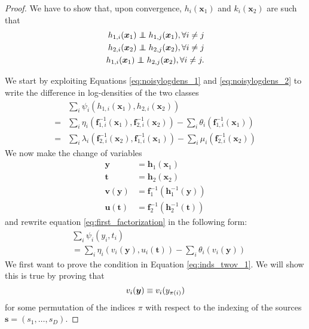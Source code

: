 \begin{proof}
We have to
show that, upon convergence, $h_{i}(\bm{x}_{1})$ and $k_{i}(\bm{x}_{2})$
are such that
\begin{align}
h_{1,i}(\bm{x}_{1})\independent h_{1,j}(\bm{x}_{1}),\forall i\neq j \label{eq:inds_twov_1} \\
h_{2,i}(\bm{x}_{2})\independent h_{2,j}(\bm{x}_{2}),\forall i\neq j \label{eq:inds_twov_2}\\
h_{1,i}(\bm{x}_{1})\independent h_{2,j}(\bm{x}_{2}),\forall i\neq j. \label{eq:inds_twov_3}
    \end{align}

We start by exploiting Equations \ref{eq:noisylogdens_1} and \ref{eq:noisylogdens_2} to write the difference in log-densities of the two classes
\begin{align}
&\sum_{i}\psi_{i}(h_{1,i}(\bm{x}_{1}),h_{2,i}(\bm{x}_{2}))\nonumber\\
=&\sum_{i}\eta_{i}(\bm{f}_{1,i}^{-1}(\bm{x}_{1}), \bm{f}_{2,i}^{-1}(\bm{x}_{2})) - \sum_{i}\theta_{i}(\bm{f}_{1,i}^{-1}(\bm{x}_{1})) \label{eq:first_factorization}\\
=&\sum_{i}\lambda_{i}(\bm{f}_{2,i}^{-1}(\bm{x}_{2}), \bm{f}_{1,i}^{-1}(\bm{x}_{1})) - \sum_{i}\mu_{i}(\bm{f}_{2,i}^{-1}(\bm{x}_{2}))\label{eq:2nd_factorization}
\end{align}
We now make the change of variables
\begin{align*}
\bm{y} & =\bm{h}_1(\bm{x}_{1})\\
\bm{t} & =\bm{h}_2(\bm{x}_{2})\\
\bm{v}(\bm{y}) & =\bm{f}_{1}^{-1}(\bm{h}_1^{-1}(\bm{y}))\\
\bm{u}(\bm{t}) & =\bm{f}_{2}^{-1}(\bm{h}_2^{-1}(\bm{t}))
\end{align*}
and rewrite equation \ref{eq:first_factorization} in the following form:
\begin{align}
&\sum_{i}\psi_{i}(y_{i},t_{i}) \nonumber \\
&=\sum_{i}\eta_{i}(v_i(\bm{y}), u_i(\bm{t}))
-\sum_{i}\theta_{i}(v_i(\bm{y}))\label{eq:logistic}
\end{align}
We first want to prove the condition in Equation \ref{eq:inds_twov_1}.
We will show this is true by proving that
\begin{equation}
\label{eq:v_onev}
v_{i}(\bm{y})  \equiv v_{i}(y_{\pi(i)})\\
\end{equation}
for some permutation of the indices $\pi$ with respect to the indexing of the sources $\bm{s} = (s_1, \ldots, s_D)$.


\end{proof}

